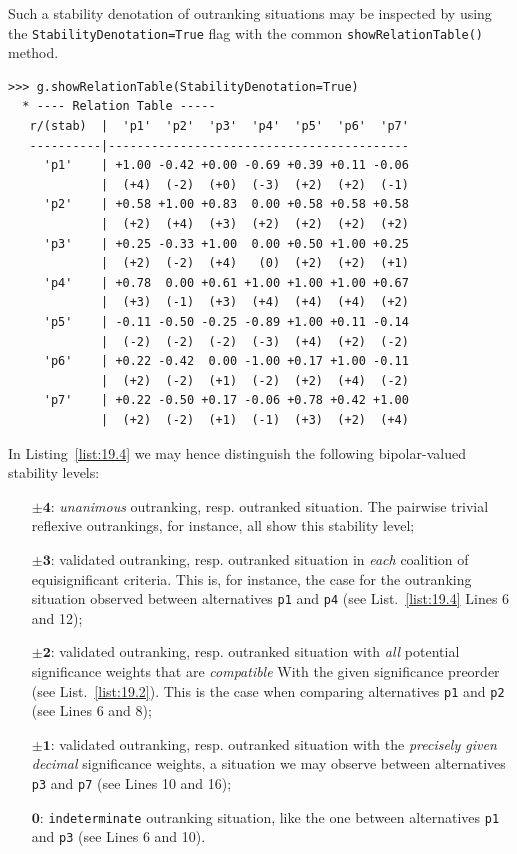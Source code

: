 Such a stability denotation of outranking situations may be inspected by using the \texttt{StabilityDenotation=True} flag  with the common \texttt{showRelationTable()} method.
\begin{lstlisting}[caption={Bipolar-valued outranking relation table with stability denotation},label=list:19.4]
>>> g.showRelationTable(StabilityDenotation=True)
  * ---- Relation Table -----
   r/(stab)  |  'p1'  'p2'  'p3'  'p4'  'p5'  'p6'  'p7'   
   ----------|------------------------------------------
     'p1'    | +1.00 -0.42 +0.00 -0.69 +0.39 +0.11 -0.06  
             |  (+4)  (-2)  (+0)  (-3)  (+2)  (+2)  (-1)  
     'p2'    | +0.58 +1.00 +0.83  0.00 +0.58 +0.58 +0.58  
             |  (+2)  (+4)  (+3)  (+2)  (+2)  (+2)  (+2)  
     'p3'    | +0.25 -0.33 +1.00  0.00 +0.50 +1.00 +0.25  
             |  (+2)  (-2)  (+4)   (0)  (+2)  (+2)  (+1)  
     'p4'    | +0.78  0.00 +0.61 +1.00 +1.00 +1.00 +0.67  
             |  (+3)  (-1)  (+3)  (+4)  (+4)  (+4)  (+2)  
     'p5'    | -0.11 -0.50 -0.25 -0.89 +1.00 +0.11 -0.14  
             |  (-2)  (-2)  (-2)  (-3)  (+4)  (+2)  (-2)  
     'p6'    | +0.22 -0.42  0.00 -1.00 +0.17 +1.00 -0.11
             |  (+2)  (-2)  (+1)  (-2)  (+2)  (+4)  (-2)  
     'p7'    | +0.22 -0.50 +0.17 -0.06 +0.78 +0.42 +1.00  
             |  (+2)  (-2)  (+1)  (-1)  (+3)  (+2)  (+4)  
\end{lstlisting}
In Listing~\vref{list:19.4} we may hence distinguish the following bipolar-valued stability levels:
\begin{itemize}[leftmargin=1cm]
\item [$\mathbf{\pm 4}$:] \emph{unanimous} outranking, resp. outranked situation. The pairwise trivial reflexive outrankings, for instance, all show this stability level;
\item [$\mathbf{\pm 3}$:] validated outranking, resp. outranked situation in \emph{each} coalition of equisignificant criteria. This is, for instance, the case for the outranking situation observed between alternatives \texttt{p1} and \texttt{p4} (see List.~\vref{list:19.4} Lines 6 and 12);
\item [$\mathbf{\pm 2}$:] validated outranking, resp. outranked situation with \emph{all} potential significance weights that are \emph{compatible} With the given significance preorder (see List.~\vref{list:19.2}). This is the case when comparing alternatives \texttt{p1} and \texttt{p2} (see Lines 6 and 8);
\item [$\mathbf{\pm 1}$:] validated outranking, resp. outranked situation with the \emph{precisely given decimal} significance weights, a situation we may observe between alternatives \texttt{p3} and \texttt{p7} (see Lines 10 and 16);
\item [$\mathbf{0}$:] \texttt{indeterminate} outranking situation, like the one between alternatives \texttt{p1} and \texttt{p3} (see Lines 6 and 10).
\end{itemize}

